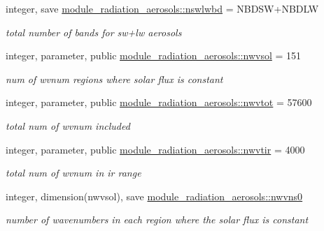 \begin{DoxyCompactItemize}
integer, save \hyperlink{group__module__radiation__aerosols_gab77b3b4aa76361277d828c7ba5dc3eda}{module\+\_\+radiation\+\_\+aerosols\+::nswlwbd} = N\+B\+D\+SW+N\+B\+D\+LW
\begin{DoxyCompactList}\small\item\em total number of bands for sw+lw aerosols \end{DoxyCompactList}\item 
\mbox{\label{group__module__radiation__aerosols_ga2e0dc6d161d1906050efd67c471673c9}} 
integer, parameter, public \hyperlink{group__module__radiation__aerosols_ga2e0dc6d161d1906050efd67c471673c9}{module\+\_\+radiation\+\_\+aerosols\+::nwvsol} = 151
\begin{DoxyCompactList}\small\item\em num of wvnum regions where solar flux is constant \end{DoxyCompactList}\item 
\mbox{\label{group__module__radiation__aerosols_gae94df49c8ff8c0ec8e6b8adb891f3c6b}} 
integer, parameter, public \hyperlink{group__module__radiation__aerosols_gae94df49c8ff8c0ec8e6b8adb891f3c6b}{module\+\_\+radiation\+\_\+aerosols\+::nwvtot} = 57600
\begin{DoxyCompactList}\small\item\em total num of wvnum included \end{DoxyCompactList}\item 
\mbox{\label{group__module__radiation__aerosols_ga45b2c26ccba5d4fd2dfccf31bcc02824}} 
integer, parameter, public \hyperlink{group__module__radiation__aerosols_ga45b2c26ccba5d4fd2dfccf31bcc02824}{module\+\_\+radiation\+\_\+aerosols\+::nwvtir} = 4000
\begin{DoxyCompactList}\small\item\em total num of wvnum in ir range \end{DoxyCompactList}\item 
\mbox{\label{group__module__radiation__aerosols_ga80194c8356dfb92a43306abbe7097711}} 
integer, dimension(nwvsol), save \hyperlink{group__module__radiation__aerosols_ga80194c8356dfb92a43306abbe7097711}{module\+\_\+radiation\+\_\+aerosols\+::nwvns0}
\begin{DoxyCompactList}\small\item\em number of wavenumbers in each region where the solar flux is constant \end{DoxyCompactList}\item 

\end{DoxyCompactItemize}
